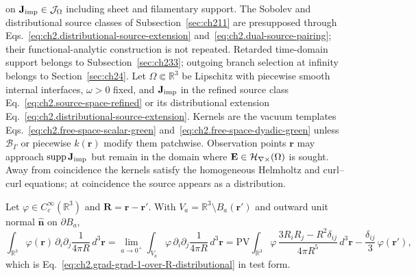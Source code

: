 on \(\mathbf{J}_{\mathrm{imp}}\in\mathcal{J}_\Omega\) including sheet and filamentary support. The
Sobolev and distributional source classes of Subsection~\ref{sec:ch211} are presupposed
through Eqs.~\eqref{eq:ch2.distributional-source-extension} and~\eqref{eq:ch2.dual-source-pairing};
their functional-analytic construction is not repeated. Retarded time-domain support
belongs to Subsection~\ref{sec:ch233}; outgoing branch selection at infinity belongs
to Section~\ref{sec:ch24}. Let \(\Omega\Subset\mathbb{R}^{3}\) be Lipschitz with piecewise smooth internal
interfaces, \(\omega>0\) fixed, and \(\mathbf{J}_{\mathrm{imp}}\) in the refined source class
Eq.~\eqref{eq:ch2.source-space-refined} or its distributional extension
Eq.~\eqref{eq:ch2.distributional-source-extension}. Kernels are the vacuum templates
Eqs.~\eqref{eq:ch2.free-space-scalar-green} and~\eqref{eq:ch2.free-space-dyadic-green}
unless \(\mathcal{B}_\Gamma\) or piecewise \(k(\mathbf{r})\) modify them patchwise.
Observation points \(\mathbf{r}\) may approach \(\operatorname{supp}\mathbf{J}_{\mathrm{imp}}\) but
remain in the domain where \(\mathbf{E}\in\mathcal{H}_{\nabla\times}(\Omega)\) is sought.
Away from coincidence the kernels satisfy the homogeneous Helmholtz and curl--curl equations;
at coincidence the source appears as a distribution.
\begin{proposition}
\label{prop:ch2.grad-grad-PV-proof}
Let $\varphi\in C_c^{\infty}(\mathbb{R}^{3})$ and $\mathbf{R}=\mathbf{r}-\mathbf{r}'$.
With $V_a=\mathbb{R}^{3}\setminus B_a(\mathbf{r}')$ and outward unit normal $\hat{\mathbf{n}}$ on $\partial B_a$,
\begin{equation}
\label{eq:ch2.grad-grad-PV-pairing}
\int_{\mathbb{R}^{3}}\varphi(\mathbf{r})\,\partial_i\partial_j\frac{1}{4\pi R}\,d^{3}\mathbf{r}
=
\lim_{a\to 0^{+}}\int_{V_a}\varphi\,\partial_i\partial_j\frac{1}{4\pi R}\,d^{3}\mathbf{r}
=
\mathrm{PV}\!\int_{\mathbb{R}^{3}}\varphi\,\frac{3R_iR_j-R^2\delta_{ij}}{4\pi R^{5}}\,d^{3}\mathbf{r}
-\frac{\delta_{ij}}{3}\,\varphi(\mathbf{r}'),
\end{equation}
which is Eq.~\eqref{eq:ch2.grad-grad-1-over-R-distributional} in test form.
\end{proposition}
